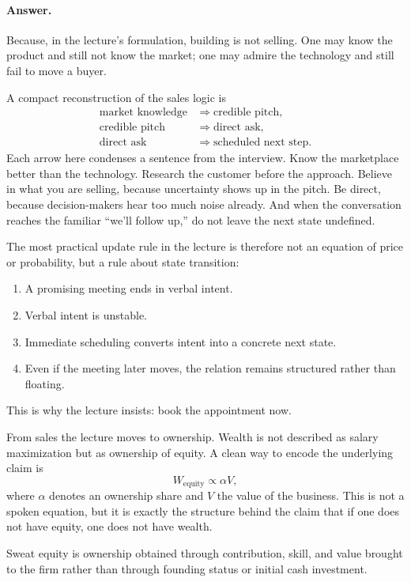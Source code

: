 \paragraph{Answer.} Because, in the lecture's formulation, building is not selling. One may know the product and still not know the market; one may admire the technology and still fail to move a buyer.

A compact reconstruction of the sales logic is
\begin{align}
\text{market knowledge} &\Rightarrow \text{credible pitch}, \\
\text{credible pitch} &\Rightarrow \text{direct ask}, \\
\text{direct ask} &\Rightarrow \text{scheduled next step}.
\end{align}
Each arrow here condenses a sentence from the interview. Know the marketplace better than the technology. Research the customer before the approach. Believe in what you are selling, because uncertainty shows up in the pitch. Be direct, because decision-makers hear too much noise already. And when the conversation reaches the familiar ``we'll follow up,'' do not leave the next state undefined.

The most practical update rule in the lecture is therefore not an equation of price or probability, but a rule about state transition:
\begin{enumerate}
\item A promising meeting ends in verbal intent.
\item Verbal intent is unstable.
\item Immediate scheduling converts intent into a concrete next state.
\item Even if the meeting later moves, the relation remains structured rather than floating.
\end{enumerate}
This is why the lecture insists: book the appointment now.

From sales the lecture moves to ownership. Wealth is not described as salary maximization but as ownership of equity. A clean way to encode the underlying claim is
\begin{equation}
W_{\text{equity}} \propto \alpha V,
\end{equation}
where \(\alpha\) denotes an ownership share and \(V\) the value of the business. This is not a spoken equation, but it is exactly the structure behind the claim that if one does not have equity, one does not have wealth.

\begin{definition}
Sweat equity is ownership obtained through contribution, skill, and value brought to the firm rather than through founding status or initial cash investment.
\end{definition}

